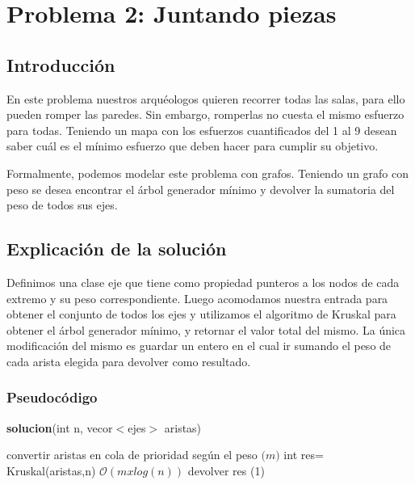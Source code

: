 \documentclass[spanish,12pt]{article}
\begin{document}
\section{Problema 2: Juntando piezas }

\subsection{Introducción}

En este problema nuestros arquéologos quieren recorrer todas las salas, para ello pueden romper las paredes. Sin embargo, romperlas no cuesta el mismo esfuerzo para todas. Teniendo un mapa con los esfuerzos cuantificados del 1 al 9 desean saber cuál es el mínimo esfuerzo que deben hacer para cumplir su objetivo.

Formalmente, podemos modelar este problema con grafos. Teniendo un grafo con peso se desea encontrar el árbol generador mínimo y devolver la sumatoria del peso de todos sus ejes.

\subsection{Explicación de la solución}

Definimos una clase eje que tiene como propiedad punteros a los nodos de cada extremo y su peso correspondiente.
Luego acomodamos nuestra entrada para obtener el conjunto de todos los ejes y utilizamos el algoritmo de Kruskal para obtener el árbol generador mínimo, y retornar el valor total del mismo. La única modificación del mismo es guardar un entero en el cual ir sumando el peso de cada arista elegida para devolver como resultado.



\subsubsection{Pseudocódigo}

\begin{algorithm}[H]{\textbf{solucion}(int n, vecor$<$ejes$>$ aristas)}
	\begin{algorithmic}[1]
		\State \quad convertir aristas en cola de prioridad según el peso \Comment $\mathcal(m)$
		\State \quad int res= Kruskal(aristas,n)  \Comment $\mathcal{O}(mxlog(n))$
		\State \quad devolver res \Comment {}(1)
	\end{algorithmic}
\end{algorithm}
\end{document}
